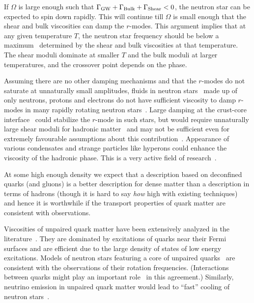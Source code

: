 \documentclass[10pt, aps, prd, superscriptaddress, nofootinbib, 
               amsmath, amssymb, twocolumn,
               preprintnumbers, showpacs,
               raggedbottom,
               floatfix]{revtex4-1}
\begin{document}
If $\Omega$ is large enough such that 
$\Gamma_{\rm{GW}}+\Gamma_{\rm{Bulk}}+\Gamma_{\rm{Shear}}<0$, the neutron star
can be expected to spin down rapidly. This will continue till $\Omega$ is small 
enough that the shear and bulk viscosities can damp the $r$-modes. This
argument implies that at any given temperature $T$, the neutron star frequency
should be below a maximum~\cite{Alford:2013pma} determined by the shear and bulk viscosities at that
temperature. The shear moduli dominate at smaller $T$ and the bulk moduli at
larger temperatures, and the crossover point depends on the phase. 

Assuming there are no other damping mechanisms and that the $r$-modes do not
saturate at unnaturally small amplitudes, fluids in neutron
stars~\cite{Flowers:1976,Flowers:1979} made up of only neutrons, protons and
electrons do not
have sufficient viscosity to damp $r$-modes in many rapidly rotating neutron
stars~\cite{Andersson:2000pt,Bildsten:1999zn,Jaikumar:2008kh,Alford:2013pma}.
Large damping at the crust-core
interface~\cite{Bildsten:1999zn,Levin:2000vq,Lindblom:2000gu} could stabilize
the $r$-mode in such stars, but would require unnaturally large shear 
moduli for hadronic matter~\cite{Rupak:2012wk} and may not be sufficient even for extremely
favourable assumptions about this contribution~\cite{Alford:2013pma}.
Appearance of various condensates and strange particles like hyperons could 
enhance the viscosity of the hadronic phase. This is a very active field of 
research~\cite{Lindblom:1999wi,Lindblom:2002,Haensel:2000vz,Haensel:2001,Haensel:2002,
Shternin:2008,Haskell:2010,Manuel:2012rd,Colucci:2013sra}. 

At some high enough density we expect that a description based on deconfined 
quarks (and gluons) is a better description for dense matter than a description 
in terms of hadrons (though it is hard to say {\it{how}} high with existing
techniques)~\cite{Jaikumar:2006rh} and hence it is worthwhile if the transport
properties of quark matter are consistent with observations. 

Viscosities of unpaired quark matter have been extensively analyzed in
the literature~\cite{Madsen:1992,Heiselberg:1993}. They are dominated by excitations of
quarks near their Fermi surfaces and are efficient due to the large density of
states of low energy excitations. Models of neutron stars featuring a core of
unpaired quarks~\cite{Jaikumar:2008kh,Alford:2013pma} are consistent with the
observations of their rotation frequencies. (Interactions between quarks might
play an important role~\cite{Schwenzer:2012ga} in this agreement.) Similarly,
neutrino emission in unpaired quark matter would lead to ``fast'' cooling of
neutron stars~\cite{Iwamoto:1980,Iwamoto:1982}. 
\end{document}
